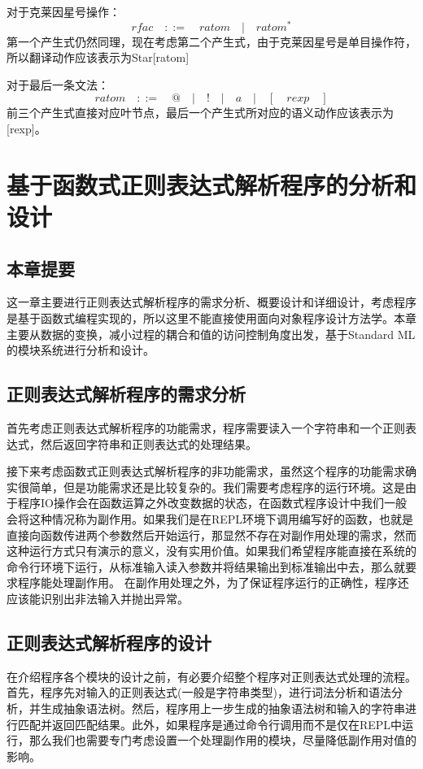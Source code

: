 \documentclass[openany,oneside]{book}
\theoremstyle{definition}
\theoremstyle{definition}
\begin{document}
	
	对于克莱因星号操作：
	\begin{equation}
		rfac\quad::=\quad ratom \quad | \quad ratom^* 
	\end{equation}
	第一个产生式仍然同理，现在考虑第二个产生式，由于克莱因星号是单目操作符，所以翻译动作应该表示为Star[ratom]
	
	
	对于最后一条文法：
	\begin{equation}
		ratom\quad::=\quad @ \quad | \quad ! \quad |\quad a \quad | \quad[\quad rexp \quad] 
	\end{equation}
	前三个产生式直接对应叶节点，最后一个产生式所对应的语义动作应该表示为[rexp]。
	\chapter{基于函数式正则表达式解析程序的分析和设计}
	\section{本章提要}
	这一章主要进行正则表达式解析程序的需求分析、概要设计和详细设计，考虑程序是基于函数式编程实现的，所以这里不能直接使用面向对象程序设计方法学。本章主要从数据的变换，减小过程的耦合和值的访问控制角度出发，基于Standard ML的模块系统进行分析和设计。
	\section{正则表达式解析程序的需求分析}
	首先考虑正则表达式解析程序的功能需求，程序需要读入一个字符串和一个正则表达式，然后返回字符串和正则表达式的处理结果。
	
	
	接下来考虑函数式正则表达式解析程序的非功能需求，虽然这个程序的功能需求确实很简单，但是功能需求还是比较复杂的。我们需要考虑程序的运行环境。这是由于程序IO操作会在函数运算之外改变数据的状态，在函数式程序设计中我们一般会将这种情况称为副作用\cite{paulson1996ml-255}。如果我们是在REPL环境下调用编写好的函数，也就是直接向函数传进两个参数然后开始运行，那显然不存在对副作用处理的需求，然而这种运行方式只有演示的意义，没有实用价值。如果我们希望程序能直接在系统的命令行环境下运行，从标准输入读入参数并将结果输出到标准输出中去，那么就要求程序能处理副作用。 在副作用处理之外，为了保证程序运行的正确性，程序还应该能识别出非法输入并抛出异常。 
	\section{正则表达式解析程序的设计}
	在介绍程序各个模块的设计之前，有必要介绍整个程序对正则表达式处理的流程。首先，程序先对输入的正则表达式(一般是字符串类型)，进行词法分析和语法分析，并生成抽象语法树。然后，程序用上一步生成的抽象语法树和输入的字符串进行匹配并返回匹配结果。此外，如果程序是通过命令行调用而不是仅在REPL中运行，那么我们也需要专门考虑设置一个处理副作用的模块，尽量降低副作用对值的影响。
	
\end{document}

